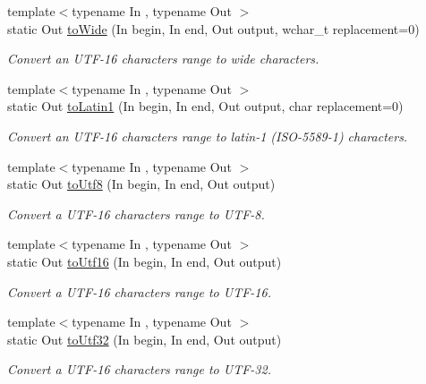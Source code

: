 \begin{DoxyCompactItemize}
{\footnotesize template$<$typename In , typename Out $>$ }\\static Out \hyperlink{classburn_1_1_utf_3_0116_01_4_a65f2422271c710bbcc92c936d581356f}{to\-Wide} (In begin, In end, Out output, wchar\-\_\-t replacement=0)
\begin{DoxyCompactList}\small\item\em Convert an U\-T\-F-\/16 characters range to wide characters. \end{DoxyCompactList}\item 
{\footnotesize template$<$typename In , typename Out $>$ }\\static Out \hyperlink{classburn_1_1_utf_3_0116_01_4_a4354f5177d6fbc6e6ce4b8fccfd4d9b5}{to\-Latin1} (In begin, In end, Out output, char replacement=0)
\begin{DoxyCompactList}\small\item\em Convert an U\-T\-F-\/16 characters range to latin-\/1 (I\-S\-O-\/5589-\/1) characters. \end{DoxyCompactList}\item 
{\footnotesize template$<$typename In , typename Out $>$ }\\static Out \hyperlink{classburn_1_1_utf_3_0116_01_4_adae74e3a4964ba5684e91cfa6a861bb9}{to\-Utf8} (In begin, In end, Out output)
\begin{DoxyCompactList}\small\item\em Convert a U\-T\-F-\/16 characters range to U\-T\-F-\/8. \end{DoxyCompactList}\item 
{\footnotesize template$<$typename In , typename Out $>$ }\\static Out \hyperlink{classburn_1_1_utf_3_0116_01_4_aec41015090448bc44e5211fbae8fc256}{to\-Utf16} (In begin, In end, Out output)
\begin{DoxyCompactList}\small\item\em Convert a U\-T\-F-\/16 characters range to U\-T\-F-\/16. \end{DoxyCompactList}\item 
{\footnotesize template$<$typename In , typename Out $>$ }\\static Out \hyperlink{classburn_1_1_utf_3_0116_01_4_a4cec6d65fd9158a791666183ec754ef4}{to\-Utf32} (In begin, In end, Out output)
\begin{DoxyCompactList}\small\item\em Convert a U\-T\-F-\/16 characters range to U\-T\-F-\/32. \end{DoxyCompactList}\end{DoxyCompactItemize}


